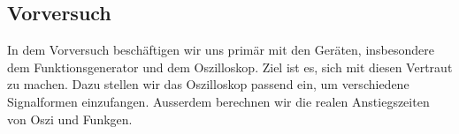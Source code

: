 \documentclass[main.tex]{subfiles}
\begin{document}
\subsection{Vorversuch}
In dem Vorversuch beschäftigen wir uns primär mit den Geräten, insbesondere dem Funktionsgenerator und dem Oszilloskop. Ziel ist es, sich mit diesen Vertraut zu machen. Dazu stellen wir das Oszilloskop passend ein, um verschiedene Signalformen einzufangen. Ausserdem berechnen wir die realen Anstiegszeiten von Oszi und Funkgen.
\end{document}
